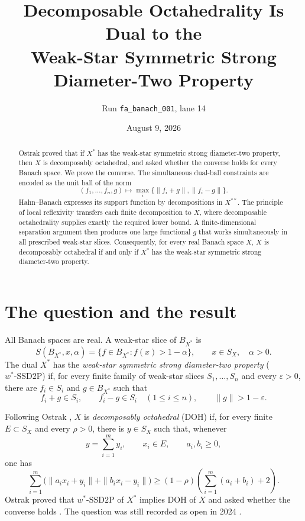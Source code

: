 \documentclass[11pt]{article}
\title{Decomposable Octahedrality Is Dual to the\\
Weak-Star Symmetric Strong Diameter-Two Property}
\author{Run \texttt{fa\_banach\_001}, lane 14}
\date{August 9, 2026}
\newcommand{\DOH}{\mathrm{DOH}}
\newcommand{\wSSD}{w^*\text{-}\mathrm{SSD2P}}
\begin{document}
\maketitle

\begin{abstract}
Ostrak proved that if $X^*$ has the weak-star symmetric strong
diameter-two property, then $X$ is decomposably octahedral, and asked
whether the converse holds for every Banach space.  We prove the converse.
The simultaneous dual-ball constraints are encoded as the unit ball of the
norm
\[
 (f_1,\ldots,f_n,g)\longmapsto
 \max_i\bigl\{\|f_i+g\|,\|f_i-g\|\bigr\}.
\]
Hahn--Banach expresses its support function by decompositions in $X^{**}$.
The principle of local reflexivity transfers each finite decomposition to
$X$, where decomposable octahedrality supplies exactly the required lower
bound.  A finite-dimensional separation argument then produces one large
functional $g$ that works simultaneously in all prescribed weak-star
slices.  Consequently, for every real Banach space $X$, $X$ is
decomposably octahedral if and only if $X^*$ has the weak-star symmetric
strong diameter-two property.
\end{abstract}

\section{The question and the result}

All Banach spaces are real.  A weak-star slice of $B_{X^*}$ is
\[
 S(B_{X^*},x,\alpha)
 =\{f\in B_{X^*}:f(x)>1-\alpha\},
 \qquad x\in S_X,\quad \alpha>0.
\]
The dual $X^*$ has the \emph{weak-star symmetric strong diameter-two
property} ($\wSSD$) if, for every finite family of weak-star slices
$S_1,\ldots,S_n$ and every $\varepsilon>0$, there are $f_i\in S_i$ and
$g\in B_{X^*}$ such that
\[
 f_i+g\in S_i,\qquad f_i-g\in S_i\quad(1\le i\le n),
 \qquad \|g\|>1-\varepsilon.
\]

Following Ostrak \cite{Ostrak}, $X$ is \emph{decomposably octahedral}
($\DOH$) if, for every finite $E\subset S_X$ and every $\rho>0$, there is
$y\in S_X$ such that, whenever
\[
 y=\sum_{i=1}^m y_i,\qquad x_i\in E,\qquad a_i,b_i\ge0,
\]
one has
\begin{equation}\label{eq:doh}
 \sum_{i=1}^m
 \bigl(\|a_i x_i+y_i\|+\|b_i x_i-y_i\|\bigr)
 \ge (1-\rho)
 \left(\sum_{i=1}^m(a_i+b_i)+2\right).
\end{equation}
Ostrak proved that $\wSSD$ of $X^*$ implies $\DOH$ of $X$ and asked
whether the converse holds \cite[Proposition~2.1 and p.~7]{Ostrak}.
The question was still recorded as open in 2024
\cite[Section~4, paragraph preceding Question~4.2]{HKO}.
\end{document}
